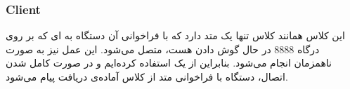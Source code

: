 \subsubsection{Client}
این کلاس همانند کلاس 
تنها یک متد
 دارد که با فراخوانی آن دستگاه به 
ای که بر روی درگاه 8888 در حال گوش دادن هست، متصل می‌شود. این عمل نیز به صورت ناهمزمان انجام می‌شود. بنابراین از یک
استفاده کرده‌ایم و در صورت کامل شدن اتصال، دستگاه با فراخوانی متد
از کلاس 
آماده‌ی دریافت پیام می‌شود.